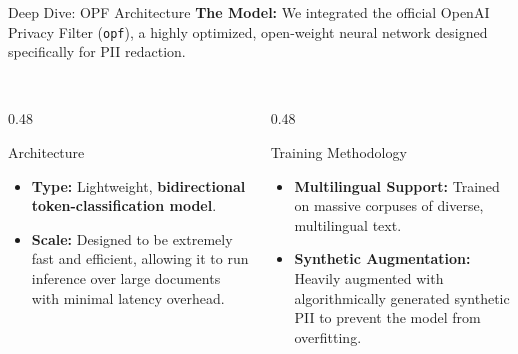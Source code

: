 \documentclass[aspectratio=169]{beamer}
\begin{document}
\begin{frame}{Deep Dive: OPF Architecture}
    \textbf{The Model:} We integrated the official OpenAI Privacy Filter (\texttt{opf}), a highly optimized, open-weight neural network designed specifically for PII redaction. \\~\\
    
    \begin{columns}[T]
        \begin{column}{0.48\textwidth}
            \begin{block}{Architecture}
                \begin{itemize}
                    \item \textbf{Type:} Lightweight, \textbf{bidirectional token-classification model}.
                    \item \textbf{Scale:} Designed to be extremely fast and efficient, allowing it to run inference over large documents with minimal latency overhead.
                \end{itemize}
            \end{block}
        \end{column}
        
        \begin{column}{0.48\textwidth}
            \begin{block}{Training Methodology}
                \begin{itemize}
                    \item \textbf{Multilingual Support:} Trained on massive corpuses of diverse, multilingual text.
                    \item \textbf{Synthetic Augmentation:} Heavily augmented with algorithmically generated synthetic PII to prevent the model from overfitting.
                \end{itemize}
            \end{block}
        \end{column}
    \end{columns}
\end{frame}
\end{document}
